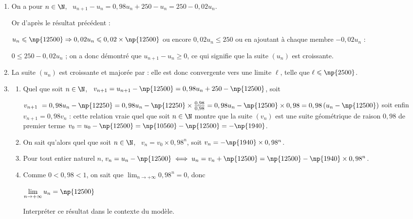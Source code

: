 \begin{enumerate}
$0,98u_n \leqslant 0,98 \times \np{12500}$ et en ajoutant 250 à chaque membre :

$0,98u_n + 250  \leqslant 0,98 \times \np{12500} + 250$ ou $u_{n+1}  \leqslant \np{12250} + 250 $ et finalement $u_{n+1} \leqslant \np{12500}$ : la proposition est vraie au r	ng $n + 1$.

La proposition est vraie au rang 0 et si elle est vraie au rang $n \in \N$ elle est vraie au rang $n + 1$ : d'après le principe de la récurrence la proposition $u_n \leqslant \np{12500}$ est vraie pur tout naturel $n \in \N$.
\item 
On a pour $n \in \N$, \, $u_{n+1} - u_n = 0,98u_n + 250 - u_n = 250  - 0,02u_n$.

Or d'après le résultat précédent :

$u_n \leqslant \np{12500} \Rightarrow 0,02u_n \leqslant 0,02 \times \np{12500}$ ou encore $0,02u_n \leqslant 250$ ou en ajoutant à chaque membre $- 0,02u_n$ :

$0 \leqslant 250 - 0,02u_n$ ; on a donc démontré que $u_{n+1} - u_n  \geqslant 0$, ce qui signifie que la suite $\left(u_n\right)$ est croissante.
\item 
La suite $\left(u_n\right)$ est croissante et majorée par  : elle est donc convergente vers une limite $\ell$, telle que $\ell \leqslant \np{2500}$.
\item 
	\begin{enumerate}
		\item 
		Quel que soit $n \in \N$, \, $v_{n+1} = u_{n+1} - \np{12500} = 0,98u_n + 250 - \np{12500}$, soit 
		
		$v_{n+1}  = 0,98u_n - \np{12250} = 0,98u_n - \np{12250}\times \frac{0,98}{0,98} = 0,98u_n - \np{12500} \times 0,98 = 0,98\left(u_n - \np{12500}\right)$ soit enfin $v_{n+1} = 0,98v_n$ : cette relation vraie quel que soit $n \in \N$ montre que la suite $\left(v_n\right)$ est une suite géométrique de raison $0,98$ de premier terme $v_0 = u_0 - \np{12500} = \np{10560} - \np{12500} = - \np{1940}$.
		\item 
		On sait qu'alors quel que soit $n \in \N$, \, $v_n = v_0 \times 0,98^n$, soit $v_n = - \np{1940} \times 0,98^n$.
		\item 
Pour tout entier naturel $n$,\,$v_n = u_n - \np{12500} \iff u_n = v_n + \np{12500} = \np{12500} - \np{1940} \times 0,98^n$.
		\item 
		
Comme $0 < 0,98 < 1$, on sait que $\displaystyle\lim_{n \to + \infty} 0,98^n = 0$, donc 
		
$\displaystyle\lim_{n \to + \infty} u_n = \np{12500}$
		
Interpréter ce résultat dans le contexte du modèle.
	\end{enumerate}
\end{enumerate}

